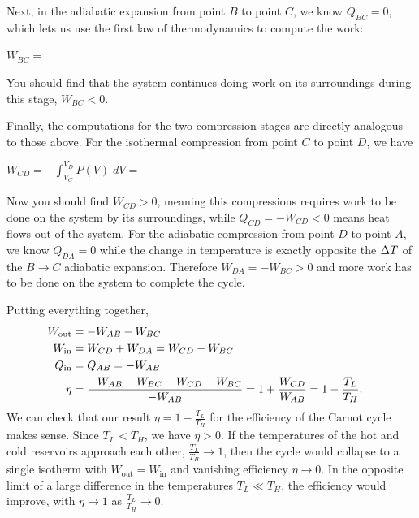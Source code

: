 Next, in the adiabatic expansion from point $B$ to point $C$, we know $Q_{BC} = 0$, which lets us use the first law of thermodynamics to compute the work:
\begin{mdframed}
  $\displaystyle W_{BC} = $ \\[50 pt]
\end{mdframed}
You should find that the system continues doing work on its surroundings during this stage, $W_{BC} < 0$.

Finally, the computations for the two compression stages are directly analogous to those above.
For the isothermal compression from point $C$ to point $D$, we have
\begin{mdframed}
  $\displaystyle W_{CD} = -\int_{V_C}^{V_D} P(V) \; dV = $ \\[50 pt]
\end{mdframed}
Now you should find $W_{CD} > 0$, meaning this compressions requires work to be done on the system by its surroundings, while $Q_{CD} = -W_{CD} < 0$ means heat flows out of the system.
For the adiabatic compression from point $D$ to point $A$, we know $Q_{DA} = 0$ while the change in temperature is exactly opposite the $\Delta T$ of the $B \to C$ adiabatic expansion.
Therefore $W_{DA} = -W_{BC} > 0$ and more work has to be done on the system to complete the cycle.

Putting everything together,
\begin{align}
  W_{\text{out}} & = -W_{AB} - W_{BC} \cr
  W_{\text{in}} & = W_{CD} + W_{DA} = W_{CD} - W_{BC} \cr
  Q_{\text{in}} & = Q_{AB} = -W_{AB} \cr
  \eta & = \frac{-W_{AB} - W_{BC} - W_{CD} + W_{BC}}{-W_{AB}} = 1 + \frac{W_{CD}}{W_{AB}} = 1 - \frac{T_L}{T_H}.
\end{align}
We can check that our result $\eta = 1 - \frac{T_L}{T_H}$ for the efficiency of the Carnot cycle makes sense.
Since $T_L < T_H$, we have $\eta > 0$.
If the temperatures of the hot and cold reservoirs approach each other, $\frac{T_L}{T_H} \to 1$, then the cycle would collapse to a single isotherm with $W_{\text{out}} = W_{\text{in}}$ and vanishing efficiency $\eta \to 0$.
In the opposite limit of a large difference in the temperatures $T_L \ll T_H$, the efficiency would improve, with $\eta \to 1$ as $\frac{T_L}{T_H} \to 0$.

